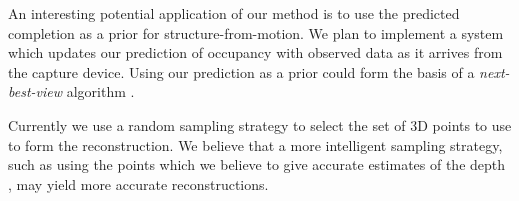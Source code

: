 \documentclass[10pt,twocolumn,letterpaper]{article}
\begin{document}
An interesting potential application of our method is to use the predicted completion as a prior for structure-from-motion.
We plan to implement a system which updates our prediction of occupancy with observed data as it arrives from the capture device.
Using our prediction as a prior could form the basis of a \emph{next-best-view} algorithm \cite{Potthast2014148}.

Currently we use a random sampling strategy to select the set of 3D points to use to form the reconstruction.
We believe that a more intelligent sampling strategy, such as using the points which we believe to give accurate estimates of the depth \cite{reynolds-cvpr-2011}, may yield more accurate reconstructions.




{\small


}
\end{document}
